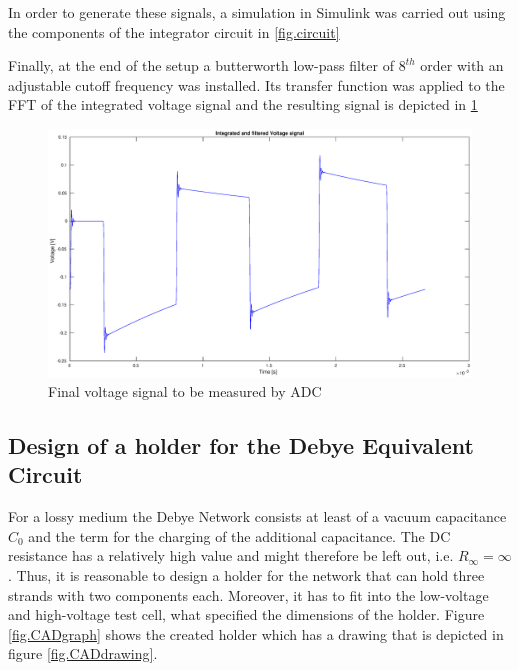 In order to generate these signals, a simulation in Simulink was carried out using the components of the integrator circuit in \ref{fig.circuit}


Finally, at the end of the setup a butterworth low-pass filter of $8^{th}$ order with an adjustable cutoff frequency
was installed. Its transfer function was applied to the FFT of the integrated voltage signal and the resulting 
signal is depicted in \ref{fig.finalvolt}


\begin{figure}[h!tb]
\centerline{\includegraphics[width=\textwidth]{figures/Method/signal_simulation/finalvolt.eps}}
\caption{Final voltage signal to be measured by ADC}
\label{fig.finalvolt}
\end{figure}


\subsection{Design of a holder for the Debye Equivalent Circuit}
For a lossy medium the Debye Network consists at least of a vacuum capacitance $C_0$ and the term for the charging of the additional capacitance. The DC resistance has a relatively high value and might therefore be left out, i.e. $R_{\infty}={\infty}$. Thus, it is reasonable to design a holder for the network that can hold three strands with two components each. Moreover, it has to fit into the low-voltage and high-voltage test cell, what specified the dimensions of the holder.  
Figure \ref{fig.CADgraph} shows the created holder which has a drawing that is depicted in figure \ref{fig.CADdrawing}.

